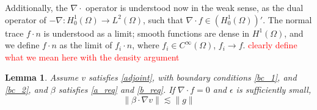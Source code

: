 \documentclass[11pt,onecolumn]{scrartcl}
\newcommand{\grad}{\nabla}
\renewcommand{\div}{\grad \cdot}
\newtheorem{lemma}{Lemma}
\begin{document}
Additionally, the $\div$ operator is understood now in the weak sense, as the dual operator of $-\grad : H_0^1(\Omega) \rightarrow L^2(\Omega)$, such that $\div f \in \left(H_0^1(\Omega)\right)'$. The normal trace $f\cdot n$ is understood as a limit; smooth functions are dense in $H^1(\Omega)$, and we define $f\cdot n$ as the limit of $f_i\cdot n$, where $f_i \in C^\infty(\Omega)$, $f_i \rightarrow f$.
\textcolor{red}{clearly define what we mean here with the density argument}

\begin{lemma} 
\label{lemma_stream}
Assume $v$ satisfies \eqref{adjoint}, with boundary conditions \eqref{bc_1}, and \eqref{bc_2}, and $\beta$ satisfies \eqref{a_req} and \eqref{b_req}.  If $\div f = 0$ and $\epsilon$ is sufficiently small, 
\[
\|\beta \cdot \grad v \| \lesssim \| g\|
\]
\end{lemma}
\end{document}
